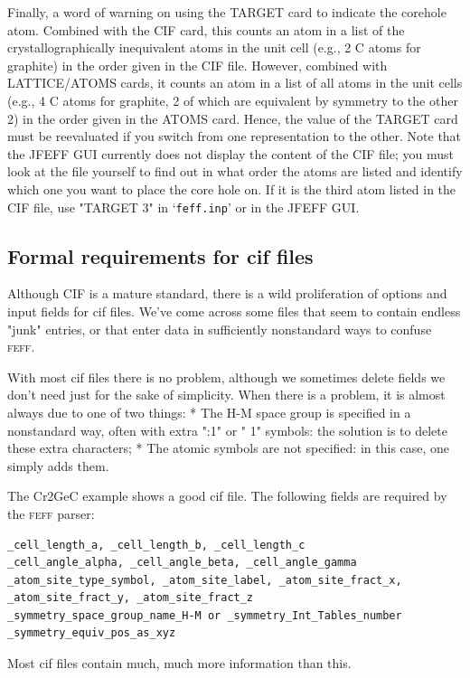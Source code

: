\documentclass[11pt,oneside]{report} %
\newcommand{\program}[1]{\textsc{#1}}
\newcommand{\feff}{\program{feff}}
\newcommand{\file}[1]{`\texttt{#1}'}
\begin{document}
Finally, a word of warning on using the TARGET card to indicate the corehole atom.  Combined with the CIF card, this counts an atom in a list of the crystallographically inequivalent atoms in the unit cell (e.g., 2 C atoms for graphite) in the order given in the CIF file.  However, combined with LATTICE/ATOMS cards, it counts an atom in a list of all atoms in the unit cells (e.g., 4 C atoms for graphite, 2 of which are equivalent by symmetry to the other 2) in the order given in the ATOMS card.  Hence, the value of the TARGET card must be reevaluated if you switch from one representation to the other.  Note that the JFEFF GUI currently does not display the content of the CIF file; you must look at the file yourself to find out in what order the atoms are listed and identify which one you want to place the core hole on.  If it is the third atom listed in the CIF file, use "TARGET 3" in \file{feff.inp} or in the JFEFF GUI.

\subsection{Formal requirements for cif files}
Although CIF is a mature standard, there is a wild proliferation of options and input fields for cif files.  We've come across some files that seem to contain endless "junk" entries, or that enter data in sufficiently nonstandard ways to confuse {\feff}.

With most cif files there is no problem, although we sometimes delete fields we don't need just for the sake of simplicity.  When there is a problem, it is almost always due to one of two things:
* The H-M space group is specified in a nonstandard way, often with extra ":1" or " 1" symbols: the solution is to delete these extra characters;
* The atomic symbols are not specified: in this case, one simply adds them.

The Cr2GeC example shows a good cif file.  The following fields are required by the {\feff} parser:
\begin{verbatim}_cell_length_a, _cell_length_b, _cell_length_c
_cell_angle_alpha, _cell_angle_beta, _cell_angle_gamma
_atom_site_type_symbol, _atom_site_label, _atom_site_fract_x, _atom_site_fract_y, _atom_site_fract_z
_symmetry_space_group_name_H-M or _symmetry_Int_Tables_number
_symmetry_equiv_pos_as_xyz \end{verbatim}

Most cif files contain much, much more information than this.


\end{document}
